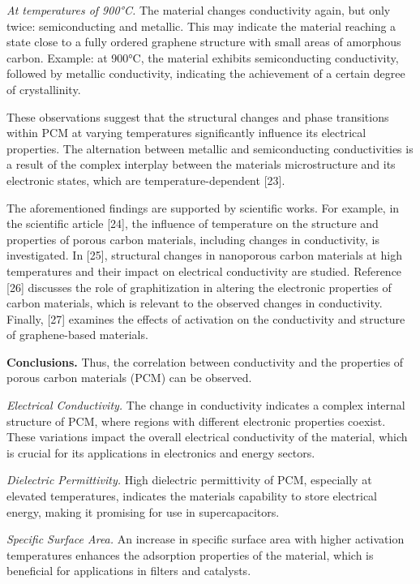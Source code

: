 \begin{multicols}{2}
\emph{At temperatures of 900°C.} The material changes conductivity
again, but only twice: semiconducting and metallic. This may indicate
the material reaching a state close to a fully ordered graphene
structure with small areas of amorphous carbon. Example: at 900°C, the
material exhibits semiconducting conductivity, followed by metallic
conductivity, indicating the achievement of a certain degree of
crystallinity.

These observations suggest that the structural changes and phase
transitions within PCM at varying temperatures significantly influence
its electrical properties. The alternation between metallic and
semiconducting conductivities is a result of the complex interplay
between the material\textquotesingle s microstructure and its electronic
states, which are temperature-dependent {[}23{]}.

The aforementioned findings are supported by scientific works. For
example, in the scientific article {[}24{]}, the influence of
temperature on the structure and properties of porous carbon materials,
including changes in conductivity, is investigated. In {[}25{]},
structural changes in nanoporous carbon materials at high temperatures
and their impact on electrical conductivity are studied. Reference
{[}26{]} discusses the role of graphitization in altering the electronic
properties of carbon materials, which is relevant to the observed
changes in conductivity. Finally, {[}27{]} examines the effects of
activation on the conductivity and structure of graphene-based
materials.

{\bfseries Conclusions.} Thus, the correlation between conductivity and the
properties of porous carbon materials (PCM) can be observed.

\emph{Electrical Conductivity.} The change in conductivity indicates a
complex internal structure of PCM, where regions with different
electronic properties coexist. These variations impact the overall
electrical conductivity of the material, which is crucial for its
applications in electronics and energy sectors.

\emph{Dielectric Permittivity.} High dielectric permittivity of PCM,
especially at elevated temperatures, indicates the
material\textquotesingle s capability to store electrical energy, making
it promising for use in supercapacitors.

\emph{Specific Surface Area.} An increase in specific surface area with
higher activation temperatures enhances the adsorption properties of the
material, which is beneficial for applications in filters and catalysts.


\end{multicols}
